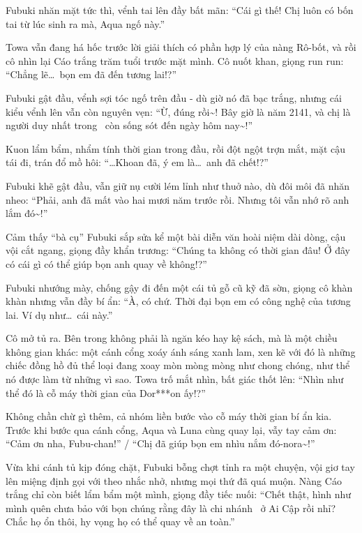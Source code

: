 \documentclass[../main.tex]{subfiles}
\begin{document}
Fubuki nhăn mặt tức thì, vểnh tai lên đầy bất mãn: ``Cái gì thế! Chị luôn có bốn tai từ lúc sinh ra mà, Aqua ngố này.''

Towa vẫn đang há hốc trước lời giải thích có phần hợp lý của nàng Rô-bốt, và rồi cô nhìn lại Cáo trắng trăm tuổi trước mặt mình. Cô nuốt khan, giọng run run: ``Chẳng lẽ\dots\ bọn em đã đến tương lai!?''

Fubuki gật đầu, vểnh sợi tóc ngố trên đầu - dù giờ nó đã bạc trắng, nhưng cái kiểu vểnh lên vẫn còn nguyên vẹn: ``Ừ, đúng rồi\~{}! Bây giờ là năm 2141, và chị là người duy nhất trong \hll\ còn sống sót đến ngày hôm nay\~{}!''

Kuon lẩm bẩm, nhẩm tính thời gian trong đầu, rồi đột ngột trợn mắt, mặt cậu tái đi, trán đổ mồ hôi: ``\dots Khoan đã, ý em là\dots\ anh đã chết!?''

Fubuki khẽ gật đầu, vẫn giữ nụ cười lém lỉnh như thuở nào, dù đôi môi đã nhăn nheo: ``Phải, anh đã mất vào hai mươi năm trước rồi. Nhưng tôi vẫn nhớ rõ anh lắm đó\~{}!''

Cảm thấy ``bà cụ'' Fubuki sắp sửa kể một bài diễn văn hoài niệm dài dòng, cậu vội cắt ngang, giọng đầy khẩn trương: ``Chúng ta không có thời gian đâu! Ở đây có cái gì có thể giúp bọn anh quay về không!?''

Fubuki nhướng mày, chống gậy đi đến một cái tủ gỗ cũ kỹ đã sờn, giọng cô khàn khàn nhưng vẫn đầy bí ẩn: ``À, có chứ. Thời đại bọn em có công nghệ của tương lai. Ví dụ như\dots\ cái này.''

Cô mở tủ ra. Bên trong không phải là ngăn kéo hay kệ sách, mà là một chiều không gian khác: một cánh cổng xoáy ánh sáng xanh lam, xen kẽ với đó là những chiếc đồng hồ đủ thể loại đang xoay mòn mòng mòng như chong chóng, như thể nó được làm từ những vì sao. Towa trố mắt nhìn, bất giác thốt lên: ``Nhìn như thể đó là cỗ máy thời gian của Dor***on ấy!?''

Không chần chừ gì thêm, cả nhóm liền bước vào cỗ máy thời gian bí ẩn kia. Trước khi bước qua cánh cổng, Aqua và Luna cùng quay lại, vẫy tay cảm ơn: ``Cảm ơn nha, Fubu-chan!'' / ``Chị đã giúp bọn em nhìu nắm đó-nora\~{}!''

Vừa khi cánh tủ kịp đóng chặt, Fubuki bỗng chợt tỉnh ra một chuyện, vội giơ tay lên miệng định gọi với theo nhắc nhở, nhưng mọi thứ đã quá muộn. Nàng Cáo trắng chỉ còn biết lẩm bẩm một mình, giọng đầy tiếc nuối: ``Chết thật, hình như mình quên chưa bảo với bọn chúng rằng đây là chi nhánh \hll\ ở Ai Cập rồi nhỉ? Chắc họ ổn thôi, hy vọng họ có thể quay về an toàn.''
\end{document}
